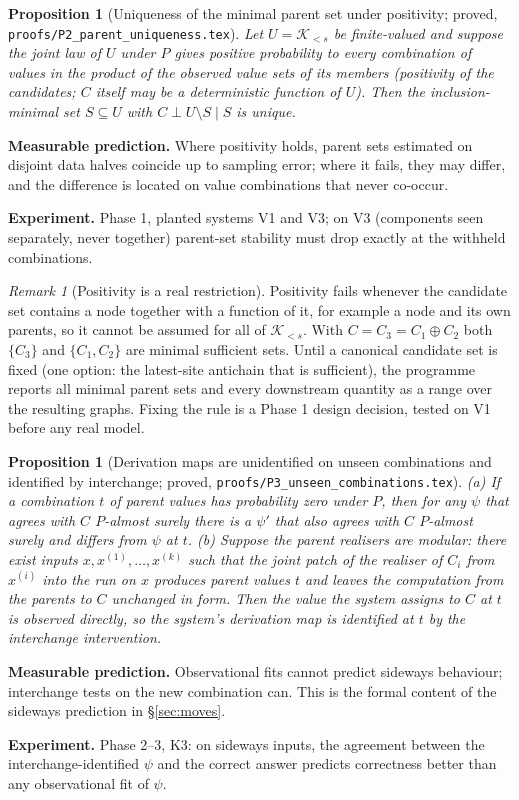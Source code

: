 \documentclass[11pt]{article}
\theoremstyle{definition}
\theoremstyle{plain}
\newtheorem{proposition}[definition]{Proposition}
\theoremstyle{remark}
\newtheorem{remark}[definition]{Remark}
\newcommand{\predict}[1]{\par\noindent\textbf{Measurable prediction.} #1}
\newcommand{\experiment}[1]{\par\noindent\textbf{Experiment.} #1\par\medskip}
\begin{document}
\begin{proposition}[Uniqueness of the minimal parent set under positivity;
proved, \texttt{proofs/P2\_parent\_uniqueness.tex}]\label{prop:unique}
Let $U=\mathcal{K}_{<s}$ be finite-valued and suppose the joint law of $U$
under $P$ gives positive probability to every combination of values in the
product of the observed value sets of its members (positivity of the
candidates; $C$ itself may be a deterministic function of $U$). Then the
inclusion-minimal set $S\subseteq U$ with $C\perp U\setminus S\mid S$ is
unique.
\end{proposition}
\predict{Where positivity holds, parent sets estimated on disjoint data halves
coincide up to sampling error; where it fails, they may differ, and the
difference is located on value combinations that never co-occur.}
\experiment{Phase 1, planted systems V1 and V3; on V3 (components seen
separately, never together) parent-set stability must drop exactly at the
withheld combinations.}

\begin{remark}[Positivity is a real restriction]
Positivity fails whenever the candidate set contains a node together with a
function of it, for example a node and its own parents, so it cannot be
assumed for all of $\mathcal{K}_{<s}$. With $C=C_3=C_1\oplus C_2$ both
$\{C_3\}$ and $\{C_1,C_2\}$ are minimal sufficient sets. Until a canonical
candidate set is fixed (one option: the latest-site antichain that is
sufficient), the programme reports all minimal parent sets and every
downstream quantity as a range over the resulting graphs. Fixing the rule is
a Phase 1 design decision, tested on V1 before any real model.
\end{remark}

\begin{proposition}[Derivation maps are unidentified on unseen combinations
and identified by interchange; proved,
\texttt{proofs/P3\_unseen\_combinations.tex}]\label{prop:unseen}
(a) If a combination $t$ of parent values has probability zero under $P$,
then for any $\psi$ that agrees with $C$ $P$-almost surely there is a $\psi'$
that also agrees with $C$ $P$-almost surely and differs from $\psi$ at $t$.
(b) Suppose the parent realisers are \emph{modular}: there exist inputs
$x,x^{(1)},\dots,x^{(k)}$ such that the joint patch of the realiser of $C_i$
from $x^{(i)}$ into the run on $x$ produces parent values $t$ and leaves the
computation from the parents to $C$ unchanged in form. Then the value the
system assigns to $C$ at $t$ is observed directly, so the system's derivation
map is identified at $t$ by the interchange intervention.
\end{proposition}
\predict{Observational fits cannot predict sideways behaviour; interchange
tests on the new combination can. This is the formal content of the sideways
prediction in \S\ref{sec:moves}.}
\experiment{Phase 2--3, K3: on sideways inputs, the agreement between the
interchange-identified $\psi$ and the correct answer predicts correctness
better than any observational fit of $\psi$.}
\end{document}
